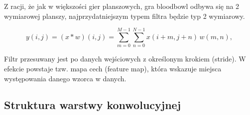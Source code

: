 Z racji, że jak w większości gier planszowych, gra bloodbowl odbywa się na 2 wymiarowej planszy, najprzydatniejszym typem filtra będzie typ 2 wymiarowy.

\[
y(i, j) = (x * w)(i, j) =
\sum_{m=0}^{M-1} \sum_{n=0}^{N-1}
x(i + m, j + n) \, w(m, n),
\]

Filtr przesuwany jest po danych wejściowych z określonym krokiem (stride). W efekcie powstaje tzw. mapa cech (feature map), która wskazuje miejsca występowania danego wzorca w danych.
%		
%		
%		
%		
%		



\subsection*{Struktura warstwy konwolucyjnej}

